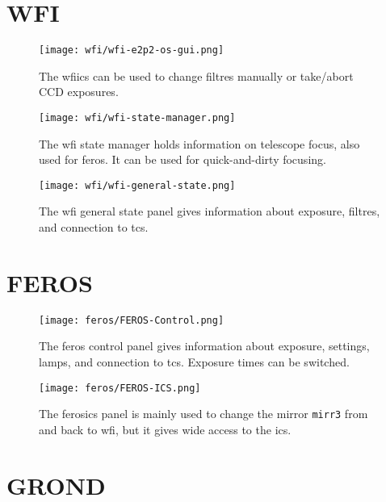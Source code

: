 \documentclass[11pt,fleqn,a4paper]{book}
\begin{document}
\section{WFI}

\begin{figure}[!ht]
\centering
\texttt{[image: wfi/wfi-e2p2-os-gui.png]}
\caption[WFI ICS Control]{The \gls{wfiics} can be used to change filtres manually or
take/abort CCD exposures.}
\label{fig:wfios}
\end{figure}

\begin{figure}[!ht]
\centering
\texttt{[image: wfi/wfi-state-manager.png]}
\caption[WFI state manager]{The \gls{wfi} \gls{state manager} holds information on telescope \gls{focus}, also used for \gls{feros}. It can be used for quick-and-dirty focusing.}
\label{fig:wfistate}
\end{figure}

\begin{figure}[!ht]
\centering
\texttt{[image: wfi/wfi-general-state.png]}
\caption[WFI \gls{General State} panel]{The \gls{wfi} general state panel gives information
about exposure, filtres, and connection to \gls{tcs}.}
\label{fig:wfigen}
\end{figure}

\section{FEROS}

\begin{figure}[!ht]
\centering
\texttt{[image: feros/FEROS-Control.png]}
\caption[FEROS control panel]{The \gls{feros} control panel gives information
about exposure, settings, lamps, and connection to \gls{tcs}.  Exposure times
can be switched.}
\label{fig:feroscon}
\end{figure}

\begin{figure}[!ht]
\centering
\texttt{[image: feros/FEROS-ICS.png]}
\caption[FEROS instrument control software panel]{The \gls{ferosics} panel is mainly used to change the mirror \texttt{\gls{mirr3}} from and back to \gls{wfi}, but it gives wide access to the \acrlong{ics}.}
\label{fig:ferosics}
\end{figure}


\section{GROND}
\end{document}

